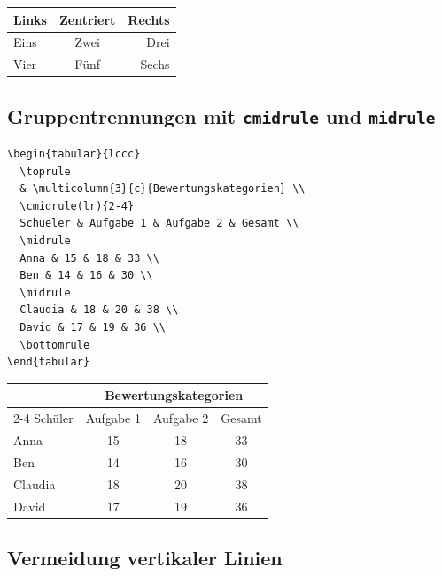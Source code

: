 \documentclass[12pt,a4paper]{article}
\begin{document}
\begin{ausgabe}
\begin{center}
\begin{tabular}{lcr}
  \toprule
  Links & Zentriert & Rechts \\
  \midrule
  Eins & Zwei & Drei \\
  Vier & Fünf & Sechs \\
  \bottomrule
\end{tabular}
\end{center}
\end{ausgabe}

\subsection{Gruppentrennungen mit \texttt{cmidrule} und \texttt{midrule}}

\begin{lstlisting}[style=latex]
\begin{tabular}{lccc}
  \toprule
  & \multicolumn{3}{c}{Bewertungskategorien} \\
  \cmidrule(lr){2-4}
  Schueler & Aufgabe 1 & Aufgabe 2 & Gesamt \\
  \midrule
  Anna & 15 & 18 & 33 \\
  Ben & 14 & 16 & 30 \\
  \midrule
  Claudia & 18 & 20 & 38 \\
  David & 17 & 19 & 36 \\
  \bottomrule
\end{tabular}
\end{lstlisting}

\begin{ausgabe}
\begin{center}
\begin{tabular}{lccc}
  \toprule
  & \multicolumn{3}{c}{Bewertungskategorien} \\
  \cmidrule(lr){2-4}
  Schüler & Aufgabe 1 & Aufgabe 2 & Gesamt \\
  \midrule
  Anna & 15 & 18 & 33 \\
  Ben & 14 & 16 & 30 \\
  \midrule
  Claudia & 18 & 20 & 38 \\
  David & 17 & 19 & 36 \\
  \bottomrule
\end{tabular}
\end{center}
\end{ausgabe}

\subsection{Vermeidung vertikaler Linien}
\end{document}
